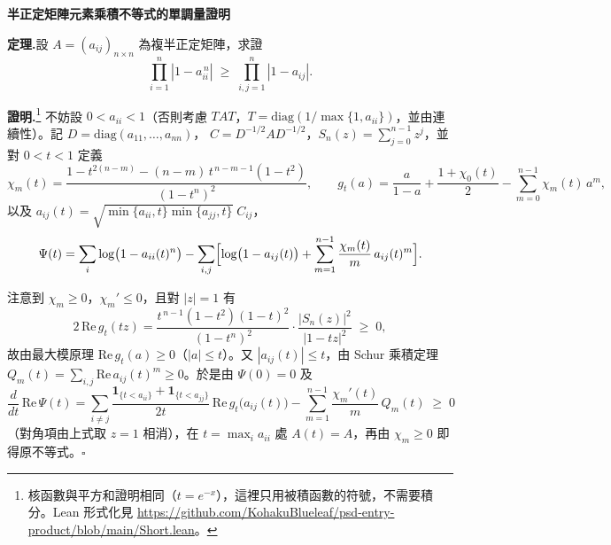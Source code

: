 \documentclass[11pt,a4paper]{article}
\newcommand{\re}{\mathrm{Re}\,}
\begin{document}
\begin{center}\LARGE\bfseries 半正定矩陣元素乘積不等式的單調量證明\end{center}
\medskip

\noindent\textbf{定理.}\quad 設 $A=(a_{ij})_{n\times n}$ 為複半正定矩陣，求證
\[
\prod_{i=1}^{n}|1-a_{ii}^{\,n}| \;\ge\; \prod_{i,j=1}^{n}|1-a_{ij}| .
\]

\noindent\textbf{證明.}\footnote{核函數與平方和證明相同（$t=e^{-x}$），這裡只用被積函數的符號，不需要積分。Lean 形式化見
\url{https://github.com/KohakuBlueleaf/psd-entry-product/blob/main/Short.lean}。}\quad
不妨設 $0<a_{ii}<1$（否則考慮 $TAT$，$T=\mathrm{diag}(1/\max\{1,a_{ii}\})$，並由連續性）。記 $D=\mathrm{diag}(a_{11},\dots,a_{nn})$，
$C=D^{-1/2}AD^{-1/2}$，$S_n(z)=\sum_{j=0}^{n-1}z^j$，並對 $0<t<1$ 定義
\[
\chi_m(t)=\frac{1-t^{2(n-m)}-(n-m)\,t^{\,n-m-1}(1-t^2)}{(1-t^n)^2},\qquad
g_t(a)=\frac{a}{1-a}+\frac{1+\chi_0(t)}{2}-\sum_{m=0}^{n-1}\chi_m(t)\,a^m ,
\]
\noindent
以及 $a_{ij}(t)=\sqrt{\min\{a_{ii},t\}\min\{a_{jj},t\}}\;C_{ij}$，
\[
\Psi(t)=\sum_{i}\log\bigl(1-a_{ii}(t)^n\bigr)
-\sum_{i,j}\Bigl[\log\bigl(1-a_{ij}(t)\bigr)+\sum_{m=1}^{n-1}\frac{\chi_m(t)}{m}\,a_{ij}(t)^m\Bigr].
\]

注意到 $\chi_m\ge0$，$\chi_m'\le0$，且對 $|z|=1$ 有
\[
2\,\re g_t(tz)=\frac{t^{\,n-1}(1-t^2)(1-t)^2}{(1-t^n)^2}\cdot\frac{|S_n(z)|^2}{|1-tz|^2}\;\ge\;0 ,
\]
故由最大模原理 $\re g_t(a)\ge0$（$|a|\le t$）。又 $|a_{ij}(t)|\le t$，由 Schur 乘積定理
$Q_m(t)=\sum_{i,j}\re a_{ij}(t)^m\ge0$。於是由 $\Psi(0)=0$ 及
\[
\frac{d}{dt}\,\re\Psi(t)=\sum_{i\ne j}\frac{\mathbf 1_{\{t<a_{ii}\}}+\mathbf 1_{\{t<a_{jj}\}}}{2t}\,\re g_t\bigl(a_{ij}(t)\bigr)
-\sum_{m=1}^{n-1}\frac{\chi_m'(t)}{m}\,Q_m(t)\;\ge\;0
\]
（對角項由上式取 $z=1$ 相消），在 $t=\max_i a_{ii}$ 處 $A(t)=A$，再由 $\chi_m\ge0$ 即得原不等式。\hfill$\square$
\end{document}
